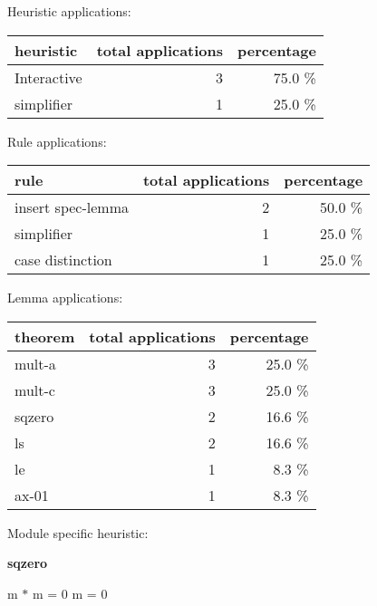 \documentclass[a4paper]{article}
\begin{document}
\medskip


Heuristic applications:

\begin{supertabular}{l|r|r}
heuristic	& total applications & percentage \\ \hline
Interactive & 3 & 75.0 \% \\
simplifier & 1 & 25.0 \% \\

\end{supertabular}

Rule applications:

\begin{supertabular}{l|r|r}
rule	        & total applications & percentage \\ \hline
insert spec-lemma & 2 & 50.0 \% \\
simplifier & 1 & 25.0 \% \\
case distinction & 1 & 25.0 \% \\

\end{supertabular}

Lemma applications:

\begin{supertabular}{l|r|r}
theorem	        & total applications & percentage \\ \hline
mult-a & 3 & 25.0 \% \\
mult-c & 3 & 25.0 \% \\
sqzero & 2 & 16.6 \% \\
ls & 2 & 16.6 \% \\
le & 1 & 8.3 \% \\
ax-01 & 1 & 8.3 \% \\

\end{supertabular}

Module specific heuristic:

\pagebreak

{\LARGE\bf sqzero}\label{lemma-sqzero}

\medskip

 \Fol m $*$ m = 0 \Equiv m = 0
\end{document}
